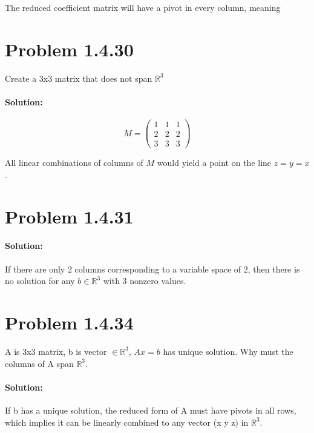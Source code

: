 \documentclass[11pt, notitlepage]{report}
\newcommand{\R}{\mathbb{R}}
\newenvironment{solution}{\paragraph{Solution:}}{\hfill}
\begin{document}
The reduced coefficient matrix will have a pivot in every column, meaning

\section{Problem 1.4.30}

Create a 3x3 matrix that does not span $\R^3$

\begin{solution}

\[M=\left(\begin{matrix}{}
  1&1 &1 \\
  2&2 &2 \\
  3&3 &3
\end{matrix}\right)\]

All linear combinations of columns of $M$ would yield a point on the line $z=y=x$.

\end{solution}

\section{Problem 1.4.31}

\begin{solution}
If there are only 2 columns corresponding to a variable space of 2, then there is no solution for any $b\in\R^3$ with 3 nonzero values.
\end{solution}

\section{Problem 1.4.34}

A is 3x3 matrix, b is vector $\in \R^3$, $Ax=b$ has unique solution. Why must the columns of A span $\R^3$.

\begin{solution}

If b has a unique solution, the reduced form of A must have pivots in all rows, which implies it can be linearly combined to any vector (x y z) in $\R^3$.

\end{solution}
\end{document}
